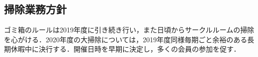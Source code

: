 \subsection*{掃除業務方針}
ゴミ箱のルールは2019年度に引き続き行い，また日頃からサークルルームの掃除を心がける．2020年度の大掃除については，2019年度同様毎期ごと余裕のある長期休暇中に決行する．開催日時を早期に決定し，多くの会員の参加を促す．

